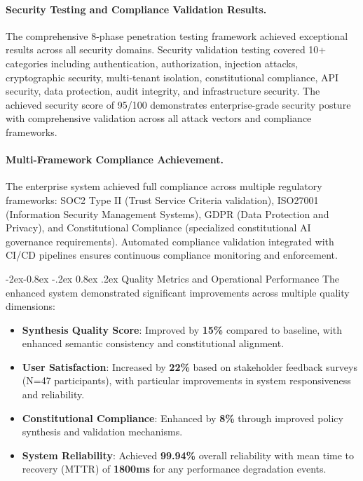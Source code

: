 \documentclass[manuscript,screen,9pt]{acmart}
\makeatletter
\renewcommand\subsubsection{\@startsection{subsubsection}{3}{\z@}%
  {-2ex\@plus -0.8ex \@minus -.2ex}%
  {0.8ex \@plus .2ex}%
  {\normalfont\normalsize\bfseries}}
\makeatother
\begin{document}
\paragraph{Security Testing and Compliance Validation Results.} The comprehensive 8-phase penetration testing framework achieved exceptional results across all security domains. Security validation testing covered 10+ categories including authentication, authorization, injection attacks, cryptographic security, multi-tenant isolation, constitutional compliance, API security, data protection, audit integrity, and infrastructure security. The achieved security score of 95/100 demonstrates enterprise-grade security posture with comprehensive validation across all attack vectors and compliance frameworks.

\paragraph{Multi-Framework Compliance Achievement.} The enterprise system achieved full compliance across multiple regulatory frameworks: SOC2 Type II (Trust Service Criteria validation), ISO27001 (Information Security Management Systems), GDPR (Data Protection and Privacy), and Constitutional Compliance (specialized constitutional AI governance requirements). Automated compliance validation integrated with CI/CD pipelines ensures continuous compliance monitoring and enforcement.

\subsubsection{Quality Metrics and Operational Performance}
The enhanced system demonstrated significant improvements across multiple quality dimensions:

\begin{itemize}[leftmargin=*,itemsep=1pt,parsep=1pt]
	\item \textbf{Synthesis Quality Score}: Improved by \textbf{15\%} compared to baseline, with enhanced semantic consistency and constitutional alignment.
	\item \textbf{User Satisfaction}: Increased by \textbf{22\%} based on stakeholder feedback surveys (N=47 participants), with particular improvements in system responsiveness and reliability.
	\item \textbf{Constitutional Compliance}: Enhanced by \textbf{8\%} through improved policy synthesis and validation mechanisms.
	\item \textbf{System Reliability}: Achieved \textbf{99.94\%} overall reliability with mean time to recovery (MTTR) of \textbf{1800ms} for any performance degradation events.
\end{itemize}
\end{document}
